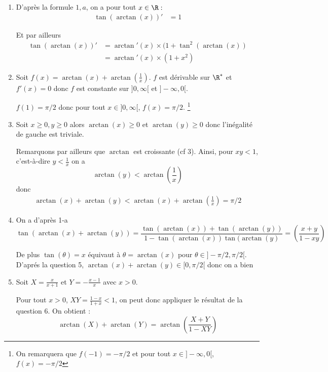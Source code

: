 \begin{correction}
\begin{enumerate}
\item D'après la formule $1,a$, on a pour tout $x \in \R:$
\begin{align*}
\tan(\arctan(x))' &=1
\end{align*}

Et par ailleurs 
\begin{align*}
\tan(\arctan(x))' &=\arctan'(x) \times (1+\tan^2(\arctan(x))\\
				&=\arctan'(x) \times (1+x^2)
\end{align*}



\item 
Soit $f(x)=\arctan(x)+\arctan(\frac{1}{x})$. $f$ est dérivable  sur $\R^*$ et $f'(x)=0$ donc $f$ est constante sur $]0, \infty [$ et $]-\infty , 0[$. 

$f(1)=\pi/2$ donc pour tout $x\in ]0, \infty [$, $f(x)=\pi/2$. 
\footnote{On remarquera que $f(-1)=-\pi/2$ et pour tout $x\in  ]-\infty , 0[$, $f(x)=-\pi/2$}



\item Soit $x\geq0, y\geq 0$ alors $\arctan(x)\geq0$ et $\arctan(y)\geq0$ donc l'inégalité de gauche est triviale. 

Remarquons par ailleurs que $\arctan$ est croissante (cf 3). Ainsi,  
 pour $xy < 1$, c'est-à-dire $y<\frac{1}{x}$ on a 
 $$\arctan(y)< \arctan(\frac{1}{x})$$
 donc 
 \begin{align*}
  \arctan(x)+\arctan(y)<\arctan(x)+\arctan(\frac{1}{x} )=\pi/2
 \end{align*}




\item On  a d'après 1-a$$\tan(\arctan(x)+\arctan(y) ) =\frac{\tan(\arctan(x))+\tan(\arctan(y))}{1-\tan(\arctan(x)) \tan(\arctan(y)}=\left(\frac{x+y}{1-xy}\right)$$


De plus $\tan(\theta)=x$ équivaut à  $\theta =\arctan (x)$ pour $\theta\in ]-\pi/2, \pi/2[$. D'aprés la question 5, $\arctan(x)+\arctan(y)\in [0, \pi/2[$ donc on a bien 


\item Soit $X= \frac{x}{x+1}$ et $Y=-\frac{x-1}{x}$ avec $x>0$. 

Pour tout $x>0$, $XY = \frac{1-x}{1+x}<1$, on peut donc appliquer le résultat de la question 6. On obtient : 
$$\arctan(X)+\arctan(Y) =\arctan\left(\frac{X+Y}{1-XY}\right)$$



\end{enumerate}
\end{correction}
